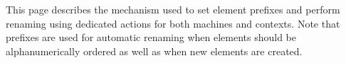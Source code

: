 This page describes the mechanism used to set element prefixes and perform renaming using dedicated actions for both machines and contexts. Note that prefixes are used for automatic renaming when elements should be alphanumerically ordered as well as when new elements are created. 






